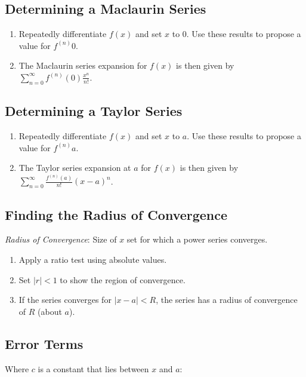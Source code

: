 \documentclass[10pt,twoside,twocolumn]{article}
\begin{document}
\subsection{Determining a Maclaurin Series}
\begin{enumerate}
\item Repeatedly differentiate $f\left(x\right)$ and set $x$ to 0. Use
these results to propose a value for $f^{\left(n\right)}0$. 
\item The Maclaurin series expansion for $f\left(x\right)$ is then given
by $\sum_{n=0}^{\infty}f^{\left(n\right)}\left(0\right)\frac{x^{n}}{n!}$. 
\end{enumerate}

\subsection{Determining a Taylor Series}
\begin{enumerate}
\item Repeatedly differentiate $f\left(x\right)$ and set $x$ to $a$.
Use these results to propose a value for $f^{\left(n\right)}a$. 
\item The Taylor series expansion at $a$ for $f\left(x\right)$ is then
given by $\sum_{n=0}^{\infty}\frac{f^{\left(n\right)}\left(a\right)}{n!}\left(x-a\right)^{n}$. 
\end{enumerate}

\subsection{Finding the Radius of Convergence}

\emph{Radius of Convergence}: Size of $x$ set for which a power series
converges.
\begin{enumerate}
\item Apply a ratio test using absolute values. 
\item Set $\left|r\right|<1$ to show the region of convergence. 
\item If the series converges for $\left|x-a\right|<R$, the series has
a radius of convergence of $R$ (about $a$). 
\end{enumerate}

\subsection{Error Terms}

Where $c$ is a constant that lies between $x$ and $a$:
\end{document}
